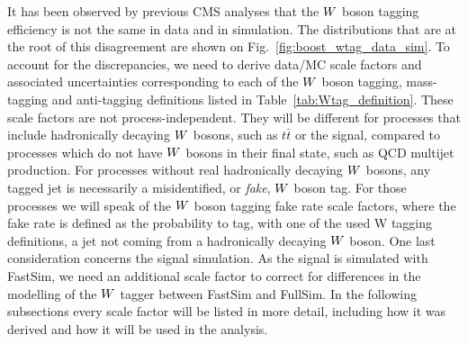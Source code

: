 It has been observed by previous CMS analyses that the $W$ boson tagging efficiency is not the same
in data and in simulation. The distributions that are at the root of this disagreement are shown on
Fig.~\ref{fig:boost_wtag_data_sim}. 
To account for the discrepancies, we need to derive data/MC scale factors and associated
uncertainties corresponding to each of the $W$ boson tagging, mass-tagging and anti-tagging
definitions listed in Table~\ref{tab:Wtag_definition}. These scale factors are not
process-independent. They will be different for processes that include hadronically decaying $W$
bosons, such as $t\bar{t}$ or the signal, compared to processes which do not have $W$ bosons in
their final state, such as QCD multijet production. For processes without real hadronically
decaying $W$ bosons, any tagged jet is necessarily a misidentified, or \textit{fake}, $W$ boson
tag. For those processes we will speak of the $W$ boson tagging fake rate scale factors, where the
fake rate is defined as the probability to tag, with one of the used W tagging definitions, a jet
not coming from a hadronically decaying $W$ boson. 
One last consideration concerns the signal simulation. As the signal is simulated with FastSim, we
need an additional scale factor to correct for differences in the modelling of the $W$ tagger
between FastSim and FullSim. 
In the following subsections every scale factor will be listed in more detail, including how it was
derived and how it will be used in the analysis. 

